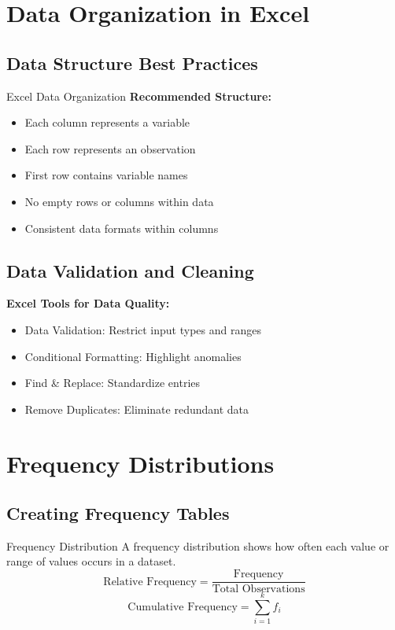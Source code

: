\documentclass[12pt,a4paper]{book}
\begin{document}
\section{Data Organization in Excel}

\subsection{Data Structure Best Practices}

\begin{example}{Excel Data Organization}
\textbf{Recommended Structure:}
\begin{itemize}
    \item Each column represents a variable
    \item Each row represents an observation
    \item First row contains variable names
    \item No empty rows or columns within data
    \item Consistent data formats within columns
\end{itemize}
\end{example}

\subsection{Data Validation and Cleaning}

\textbf{Excel Tools for Data Quality:}
\begin{itemize}
    \item Data Validation: Restrict input types and ranges
    \item Conditional Formatting: Highlight anomalies
    \item Find \& Replace: Standardize entries
    \item Remove Duplicates: Eliminate redundant data
\end{itemize}

\section{Frequency Distributions}

\subsection{Creating Frequency Tables}

\begin{definition}{Frequency Distribution}
A frequency distribution shows how often each value or range of values occurs in a dataset.
\[
\text{Relative Frequency} = \frac{\text{Frequency}}{\text{Total Observations}}
\]
\[
\text{Cumulative Frequency} = \sum_{i=1}^{k} f_i
\]
\end{definition}
\end{document}
